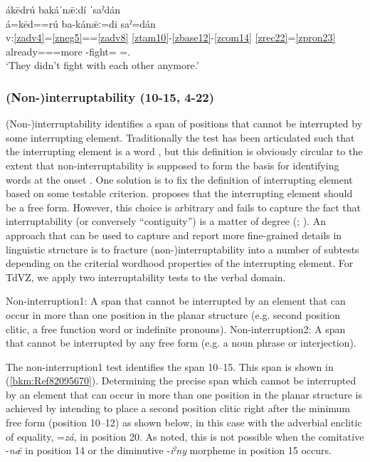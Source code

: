 \documentclass[output=paper]{langscibook}
\begin{document}
\ea\label{ex:key:zap:16}
{ákēdrú bakáˈnǣːdí ˈsaˀdán} \\
\glll á=kēd==rú ba-kánǣː=di saˀ=dán\\
v:\ref{zadv4}=\ref{zneg5}==\ref{zadv8} \ref{ztam10}-\ref{zbase12}-\ref{zcom14}  \ref{zrec22}=\ref{zpron23} \\
already=\Neg{}==more \Compl{}-fight=\Neg{} \Recp{}=\Third\Pl{}.\Inf{}\\
\glt `They didn't fight with each other anymore.'
\z

\subsubsection{(Non-)interruptability (10-15, 4-22)} \label{sec:key:4.1.2}

(Non-)interruptability identifies a span of positions that cannot be interrupted by some interrupting element. Traditionally the test has been articulated such that the interrupting element is a word \citep{bloomfield1933:language}, but this definition is obviously circular to the extent that non-interruptability is supposed to form the basis for identifying words at the onset \citep[2552]{Mugdan1993}. One solution is to fix the definition of interrupting element based on some testable criterion. \citet{Haspelmath2011} proposes that the interrupting element should be a free form. However, this choice is arbitrary and fails to capture the fact that interruptability (or conversely ``contiguity'') is a matter of degree (\citealt[190-191]{Croft2001}; \citealt[117-120]{tallman2018grammar}). An approach that can be used to capture and report more fine-grained details in linguistic structure is to fracture (non-)interruptability into a number of subtests depending on the criterial wordhood properties of the interrupting element. For TdVZ, we apply two interruptability tests to the verbal domain.

\ea Non-interruption1: A span that cannot be interrupted by an element that can occur in more than one position in the planar structure (e.g. second position clitic, a free function word or indefinite pronouns).
\ex Non-interruption2: A span that cannot be interrupted by any free form (e.g. a noun phrase or interjection).
\z 

The non-interruption1 test identifies the span 10--15. This span is shown in (\ref{bkm:Ref82095670}). Determining the precise span which cannot be interrupted by an element that can occur in more than one position in the planar structure is achieved by intending to place a second position clitic right after the minimum free form (position 10–12) as shown below, in this case with the adverbial enclitic of equality, =\textit{zá}, in position 20.  As noted, this is not possible when the comitative -\textit{nǣ} in position 14 or the diminutive -\textit{iˀny} morpheme in position 15 occurs.
\end{document}
